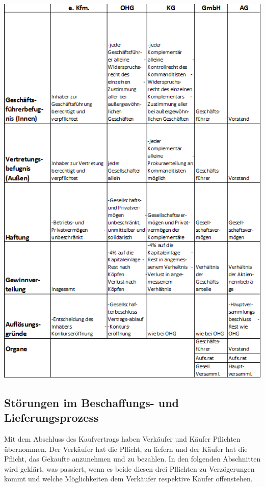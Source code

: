 \includegraphics[scale=1.0]{pictures/lf01-pic/lf01-uebersicht_unternehmen_02.png}\newpage


\subsection{Störungen im Beschaffungs- und Lieferungsprozess}
Mit dem Abschluss des Kaufvertrags haben Verkäufer und Käufer Pflichten übernommen. Der Verkäufer hat die Pflicht, zu liefern und der Käufer hat die Pflicht, das Gekaufte anzunehmen und zu bezahlen. In den folgenden Abschnitten wird geklärt, was passiert, wenn es beide diesen drei Pflichten zu Verzögerungen kommt und welche Möglichkeiten dem Verkäufer respektive Käufer offenstehen.\\

